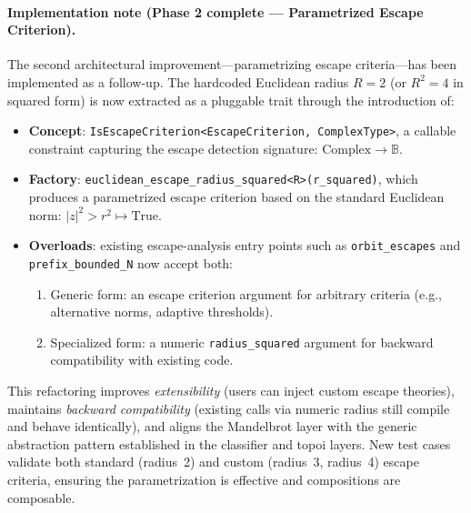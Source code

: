 \documentclass[11pt, a4paper]{report}
\begin{document}
\paragraph{Implementation note (Phase 2 complete — Parametrized Escape Criterion).}
The second architectural improvement—parametrizing escape criteria—has been implemented as a follow-up.
The hardcoded Euclidean radius $R = 2$ (or $R^2 = 4$ in squared form) is now extracted as a pluggable trait through the introduction of:
\begin{itemize}
  \item \textbf{Concept}: \texttt{IsEscapeCriterion<EscapeCriterion, ComplexType>}, a callable constraint capturing the escape detection signature: $\text{Complex} \to \mathbb{B}$.
  \item \textbf{Factory}: \texttt{euclidean\_escape\_radius\_squared<R>(r\_squared)}, which produces a parametrized escape criterion based on the standard Euclidean norm: $|z|^2 > r^2 \mapsto \text{True}$.
  \item \textbf{Overloads}: existing escape-analysis entry points such as \texttt{orbit\_escapes} and \texttt{prefix\_bounded\_N} now accept both:
    \begin{enumerate}
      \item Generic form: an escape criterion argument for arbitrary criteria (e.g., alternative norms, adaptive thresholds).
      \item Specialized form: a numeric \texttt{radius\_squared} argument for backward compatibility with existing code.
    \end{enumerate}
\end{itemize}
This refactoring improves \emph{extensibility} (users can inject custom escape theories), maintains \emph{backward compatibility} (existing calls via numeric radius still compile and behave identically), and aligns the Mandelbrot layer with the generic abstraction pattern established in the classifier and topoi layers.
New test cases validate both standard (radius~2) and custom (radius~3, radius~4) escape criteria, ensuring the parametrization is effective and compositions are composable.
\end{document}
